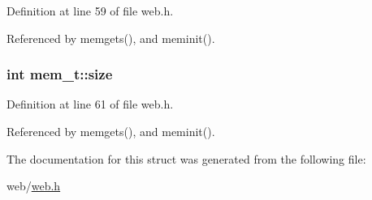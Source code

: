 Definition at line 59 of file web.\-h.



Referenced by memgets(), and meminit().

\hypertarget{structmem__t_ab04d46fb2982c9a26a26244286c1b33b}{
\subsubsection[{size}]{\setlength{\rightskip}{0pt plus 5cm}int mem\-\_\-t\-::size}}\label{structmem__t_ab04d46fb2982c9a26a26244286c1b33b}


Definition at line 61 of file web.\-h.



Referenced by memgets(), and meminit().



The documentation for this struct was generated from the following file\-:\begin{DoxyCompactItemize}
\item 
web/\hyperlink{web_8h}{web.\-h}\end{DoxyCompactItemize}
